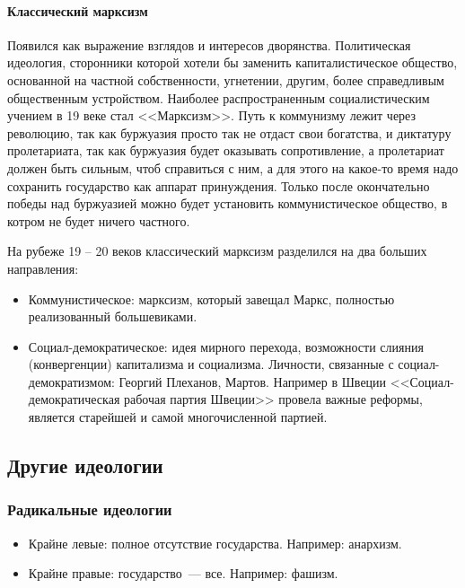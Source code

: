 \documentclass[12pt]{article}
\begin{document}
	\paragraph{Классический марксизм}
	\begin{note}
		Появился как выражение взглядов и интересов дворянства. Политическая идеология, сторонники которой хотели бы заменить капиталистическое общество, основанной на частной собственности, угнетении, другим, более справедливым общественным устройством. Наиболее распространенным социалистическим учением в 19 веке стал <<Марксизм>>. Путь к коммунизму лежит через революцию, так как буржуазия просто так не отдаст свои богатства, и диктатуру пролетариата, так как буржуазия будет оказывать сопротивление, а пролетариат должен быть сильным, чтоб справиться с ним, а для этого на какое-то время надо сохранить государство как аппарат принуждения. Только после окончательно победы над буржуазией можно будет установить коммунистическое общество, в котром не будет ничего частного.
	\end{note}
	\begin{note}
		На рубеже 19 -- 20 веков классический марксизм разделился на два больших направления:
		\begin{itemize}
			\item Коммунистическое: марксизм, который завещал Маркс, полностью реализованный большевиками.
			\item Социал-демократическое: идея мирного перехода, возможности слияния (конвергенции) капитализма и социализма. Личности, связанные с социал-демократизмом: Георгий Плеханов, Мартов. Например в Швеции <<Социал-демократическая рабочая партия Швеции>> провела важные реформы, является старейшей и самой многочисленной партией.
		\end{itemize} 
	\end{note}
	
	\subsection{Другие идеологии}
	
	\subsubsection{Радикальные идеологии}
	\begin{itemize}
		\item Крайне левые: полное отсутствие государства. Например: анархизм.
		\item Крайне правые: государство~--- все. Например: фашизм.
	\end{itemize}
	
\end{document}
